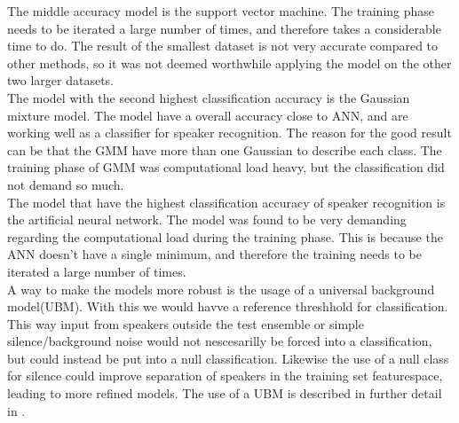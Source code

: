 The middle accuracy model is the support vector machine.
The training phase needs to be iterated a large number of times, and therefore takes a considerable time to do. 
The result of the smallest dataset is not very accurate compared to other methods, so it was not deemed worthwhile applying the model on the other two larger datasets.\\

The model with the second highest classification accuracy is the Gaussian mixture model.
The model have a overall accuracy close to ANN, and are working well as a classifier for speaker recognition. 
The reason for the good result can be that the GMM have more than one Gaussian to describe each class.
The training phase of GMM was computational load heavy, but the classification did not demand so much.\\

The model that have the highest classification accuracy of speaker recognition is the artificial neural network.
The model was found to be very demanding regarding the computational load during the training phase. 
This is because the ANN doesn't have a single minimum, and therefore the training needs to be iterated a large number of times. \\


A way to make the models more robust is the usage of a universal background model(UBM).
With this we would havve a reference threshhold for classification.
This way input from speakers outside the test ensemble or simple silence/background noise would not nescesarilly be forced into a classification, but could instead be put into a null classification.
Likewise the use of a null class for silence could improve separation of speakers in the training set featurespace, leading to more refined models.
The use of a UBM is described in further detail in \cite{Springer:36}.\\

